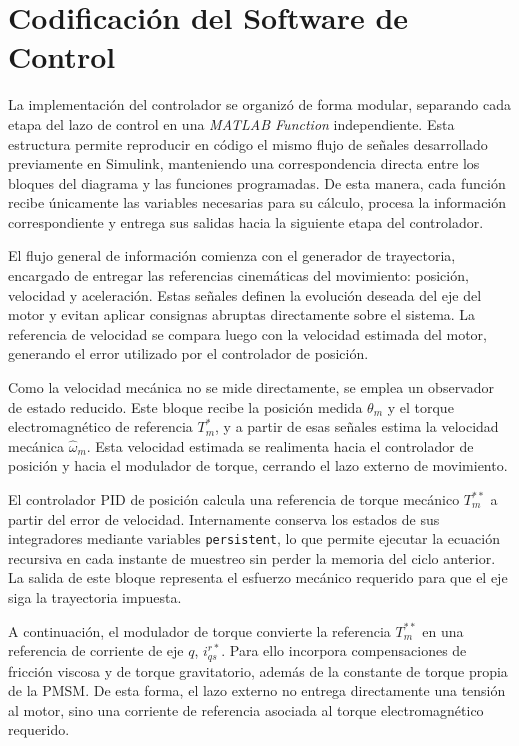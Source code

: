 \documentclass[12pt, a4paper,journal, onecolumn, compsoc]{IEEEtran}
\begin{document}
\section{Codificación del Software de Control}

La implementación del controlador se organizó de forma modular, separando cada etapa del lazo de control en una \textit{MATLAB Function} independiente. Esta estructura permite reproducir en código el mismo flujo de señales desarrollado previamente en Simulink, manteniendo una correspondencia directa entre los bloques del diagrama y las funciones programadas. De esta manera, cada función recibe únicamente las variables necesarias para su cálculo, procesa la información correspondiente y entrega sus salidas hacia la siguiente etapa del controlador.

El flujo general de información comienza con el generador de trayectoria, encargado de entregar las referencias cinemáticas del movimiento: posición, velocidad y aceleración. Estas señales definen la evolución deseada del eje del motor y evitan aplicar consignas abruptas directamente sobre el sistema. La referencia de velocidad se compara luego con la velocidad estimada del motor, generando el error utilizado por el controlador de posición.

Como la velocidad mecánica no se mide directamente, se emplea un observador de estado reducido. Este bloque recibe la posición medida $\theta_m$ y el torque electromagnético de referencia $T_m^{*}$, y a partir de esas señales estima la velocidad mecánica $\hat{\omega}_m$. Esta velocidad estimada se realimenta hacia el controlador de posición y hacia el modulador de torque, cerrando el lazo externo de movimiento.

El controlador PID de posición calcula una referencia de torque mecánico $T_m^{**}$ a partir del error de velocidad. Internamente conserva los estados de sus integradores mediante variables \texttt{persistent}, lo que permite ejecutar la ecuación recursiva en cada instante de muestreo sin perder la memoria del ciclo anterior. La salida de este bloque representa el esfuerzo mecánico requerido para que el eje siga la trayectoria impuesta.

A continuación, el modulador de torque convierte la referencia $T_m^{**}$ en una referencia de corriente de eje $q$, $i_{qs}^{r*}$. Para ello incorpora compensaciones de fricción viscosa y de torque gravitatorio, además de la constante de torque propia de la PMSM. De esta forma, el lazo externo no entrega directamente una tensión al motor, sino una corriente de referencia asociada al torque electromagnético requerido.
\end{document}
